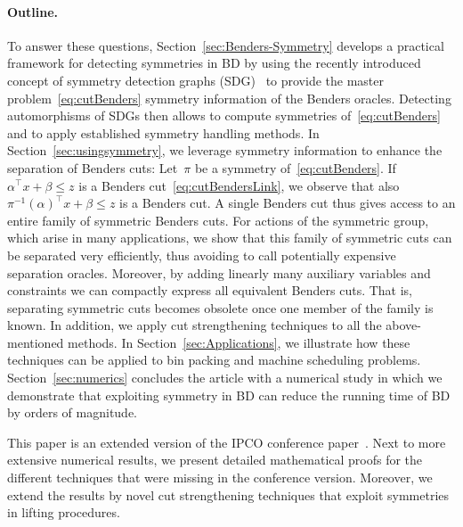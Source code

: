 \documentclass[a4paper,10pt]{article}
\newcommand{\sprod}[2]{#1^\top #2}
\theoremstyle{definition}
\begin{document}
\paragraph{Outline.}
To answer these questions, Section~\ref{sec:Benders-Symmetry} develops a practical framework for detecting symmetries in BD by using the recently introduced concept of symmetry detection graphs (SDG)~\cite{hojny2025detecting} to provide the master problem~\eqref{eq:cutBenders} symmetry information of the Benders oracles.
Detecting automorphisms of SDGs then allows to compute symmetries of~\eqref{eq:cutBenders} and to apply established symmetry handling methods.
In Section~\ref{sec:usingsymmetry}, we leverage symmetry information to enhance the separation of Benders cuts:
Let~$\pi$ be a symmetry of~\eqref{eq:cutBenders}.
If~$\sprod{\alpha}{x} + \beta \leq z$ is a Benders cut~\eqref{eq:cutBendersLink}, we observe that also~$\sprod{\pi^{-1}(\alpha)}{x} + \beta \leq z$ is a Benders cut.
A single Benders cut thus gives access to an entire family of symmetric Benders cuts.
For actions of the symmetric group, which arise in many applications, we show that this family of symmetric cuts can be separated very efficiently, thus avoiding to call potentially expensive separation oracles.
Moreover, by adding linearly many auxiliary variables and constraints we can compactly express all equivalent Benders cuts.
That is, separating symmetric cuts becomes obsolete once one member of the family is known.
In addition, we apply cut strengthening techniques to all the above-mentioned methods.
In Section~\ref{sec:Applications}, we illustrate how these techniques can be applied to bin packing and machine scheduling problems.
Section~\ref{sec:numerics} concludes the article with a numerical study in which we demonstrate that exploiting symmetry in BD can reduce the running time of BD by orders of magnitude.

This paper is an extended version of the IPCO conference paper~\cite{hojny2026IPCO}.
Next to more extensive numerical results, we present detailed mathematical proofs for the different techniques that were missing in the conference version.
Moreover, we extend the results by novel cut strengthening techniques that exploit symmetries in lifting procedures.

%
%
\end{document}
